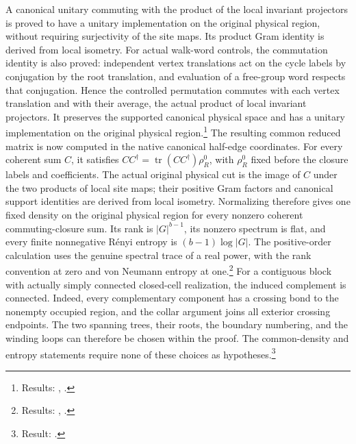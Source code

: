 \documentclass{article}
\begin{document}
A canonical unitary
commuting with the product of the local invariant projectors is proved
to have a unitary implementation on the original physical region,
without requiring surjectivity of the site maps. Its product Gram
identity is derived from local isometry. For actual walk-word controls,
the commutation identity is also proved: independent vertex translations
act on the cycle labels by conjugation by the root translation, and
evaluation of a free-group word respects that conjugation. Hence the
controlled permutation commutes with each vertex translation and with
their average, the actual product of local invariant projectors. It
preserves the supported canonical physical space and has a unitary
implementation on the original physical region.\footnote{Results:
    ,
    .}
The resulting common reduced matrix is now computed in the native canonical
half-edge coordinates. For every coherent sum $C$, it satisfies
$CC^\dagger=\operatorname{tr}(CC^\dagger)\rho_R^0$, with $\rho_R^0$ fixed
before the closure labels and coefficients. The actual original physical cut
is the image of $C$ under the two products of local site maps; their positive
Gram factors and canonical support identities are derived from local isometry.
Normalizing therefore gives one fixed density on the original physical region
for every nonzero coherent commuting-closure sum. Its rank is $|G|^{b-1}$,
its nonzero spectrum is flat, and every finite nonnegative R\'enyi entropy is
$(b-1)\log|G|$. The positive-order calculation uses the genuine spectral trace
of a real power, with the rank convention at zero and von Neumann entropy at
one.\footnote{Results:
    ,
    .}
For a contiguous block with actually simply connected closed-cell realization,
the induced complement is connected. Indeed, every complementary component
has a crossing bond to the nonempty occupied region, and the collar argument
joins all exterior crossing endpoints. The two spanning trees, their roots,
the boundary numbering, and the winding loops can therefore be chosen within
the proof. The common-density and entropy statements require none of these
choices as hypotheses.\footnote{Result:
    .}
\end{document}
